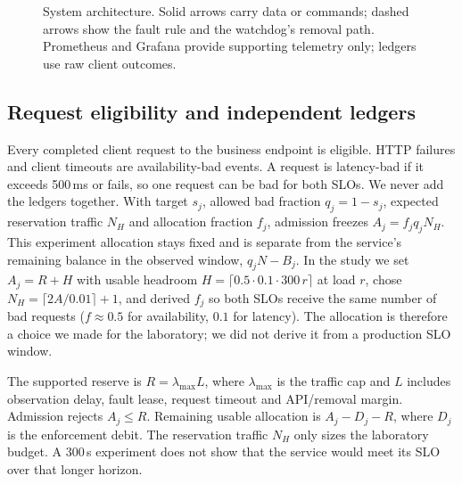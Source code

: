 \documentclass[a4paper,fleqn,11pt]{cas-dc}
\begin{document}
\begin{figure}[t]
{}
\caption{System architecture. Solid arrows carry data or commands; dashed arrows show the fault rule and the watchdog's removal path. Prometheus and Grafana provide supporting telemetry only; ledgers use raw client outcomes.}\label{fig:arch}
\end{figure}

\subsection{Request eligibility and independent ledgers}
Every completed client request to the business endpoint is eligible. HTTP failures and client timeouts are availability-bad events. A request is latency-bad if it exceeds 500\,ms or fails, so one request can be bad for both SLOs. We never add the ledgers together. With target $s_j$, allowed bad fraction $q_j=1-s_j$, expected reservation traffic $N_H$ and allocation fraction $f_j$, admission freezes $A_j=f_jq_jN_H$. This experiment allocation stays fixed and is separate from the service's remaining balance in the observed window, $q_jN-B_j$. In the study we set $A_j=R+H$ with usable headroom $H=\lceil 0.5\cdot 0.1\cdot 300\,r\rceil$ at load $r$, chose $N_H=\lceil 2A/0.01\rceil+1$, and derived $f_j$ so both SLOs receive the same number of bad requests ($f\approx0.5$ for availability, $0.1$ for latency). The allocation is therefore a choice we made for the laboratory; we did not derive it from a production SLO window.

The supported reserve is $R=\lambda_{\max}L$, where $\lambda_{\max}$ is the traffic cap and $L$ includes observation delay, fault lease, request timeout and API/removal margin. Admission rejects $A_j\leq R$. Remaining usable allocation is $A_j-D_j-R$, where $D_j$ is the enforcement debit. The reservation traffic $N_H$ only sizes the laboratory budget. A 300\,s experiment does not show that the service would meet its SLO over that longer horizon.
\end{document}
